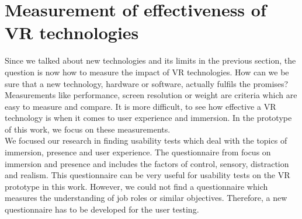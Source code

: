 \section{Measurement of effectiveness of VR technologies}
Since we talked about new technologies and its limits in the previous section, the question is now how to measure the impact of VR technologies. How can we be sure that a new technology, hardware or software, actually fulfils the promises? Measurements like performance, screen resolution or weight are criteria which are easy to measure and compare. It is more difficult, to see how effective a VR technology is when it comes to user experience and immersion. In the prototype of this work, we focus on these measurements. \\
We focused our research in finding usability tests which deal with the topics of immersion, presence and user experience. The questionnaire from \cite{Witmer.1998} focus on immersion and presence and includes the factors of control, sensory, distraction and realism. This questionnaire can be very useful for usability tests on the VR prototype in this work. However, we could not find a questionnaire which measures the understanding of job roles or similar objectives. Therefore, a new questionnaire has to be developed for the user testing.